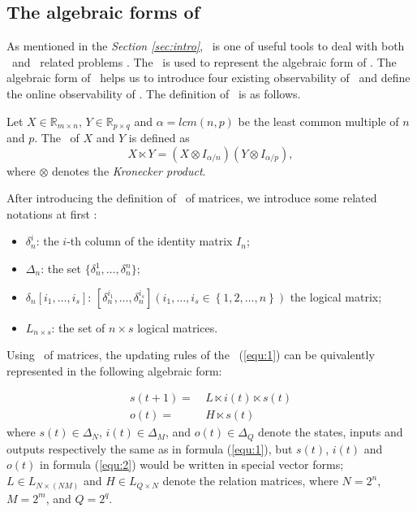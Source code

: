 \subsection{The algebraic forms of \BCNs}
As mentioned in the {\em Section \ref{sec:intro}}, \STP\ is one of useful tools to deal with  both \BNs\ and \BCNs\  related problems \cite{cheng2009controllability}. The \STP\ is used to represent the algebraic form of \BCN. The algebraic form of \BCN\ helps us to introduce four existing observability of \BCN\ and define the online observability of \BCN. The definition of \STP\ is as follows.

\begin{definition}[STP] 
	\cite{Cheng2011Analysis} Let $X\in\mathbb{R}_{m\times n}$, $Y\in\mathbb{R}_{p\times q}$ and $\alpha=lcm(n,p)$ be the least common multiple of $n$ and $p$. The \STP\ of $X$ and $Y$ is defined as \[X\ltimes Y=(X\otimes I_{\alpha/n})(Y\otimes I_{\alpha/p}),\] where $\otimes$ denotes the {\em Kronecker product}. 
\end{definition}

After introducing the definition of \STP\ of matrices,  we introduce some related notations at first \cite{Zhang2016Observability}:
\begin{itemize}
  \item $\delta^i_n$: the $i$-th column of the identity matrix $I_n$;
  \item $\Delta_n$: the set $\{\delta^1_n,\ldots,\delta^n_n \}$; 
  \item $\delta_n \left[i_1,\ldots,i_s\right]$: $\left[\delta^{i_1}_n,\ldots,\delta^{i_s}_n\right]\left(i_1,\ldots,i_s\in\left\{1,2,\ldots,n\right\}\right)$ the logical matrix;
  \item  $L_{n\times s}$: the set of $n\times s$ logical matrices.
\end{itemize}

Using \STP\ of matrices, the updating rules of the \BCN\ (\ref{equ:1}) can be quivalently represented in the following algebraic form:
\begin{definition}

\begin{equation}
\begin{split}
s(t+1)=&\ L\ltimes{i(t)}\ltimes{s(t)}\\
o(t)=&\ H\ltimes{s(t)}
\end{split}
\label{equ:2}
\end{equation}
where $s(t)\in\Delta_N$, $i(t)\in\Delta_M$, and  $o(t)\in\Delta_Q$ denote the states, inputs and outputs respectively the same as in formula (\ref{equ:1}), but $s(t)$, $i(t)$ and $o(t)$ in formula (\ref{equ:2}) would be written in special vector forms; $L\in L_{N\times\left(NM\right)}$ and $H\in L_{Q\times N}$ denote the relation matrices, where $N=2^n$, $M=2^m$, and $Q=2^q$. 
\end{definition}

